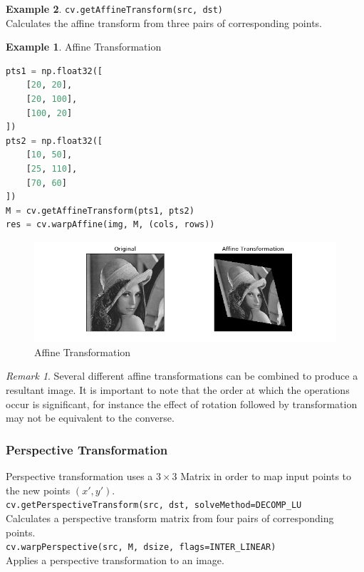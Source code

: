 \documentclass{article}
\theoremstyle{definition}
\newtheorem{ex}{Example}[subsection]
\theoremstyle{remark}
\newtheorem*{rem}{Remark}
\newcommand{\func}[2]{\noindent\lstinline{#1}\\#2}
\begin{document}
\begin{ex}
\func{cv.getAffineTransform(src, dst)}{Calculates the affine transform from three pairs of corresponding points.}

\begin{ex} Affine Transformation
\begin{lstlisting}[language=Python]
pts1 = np.float32([ 
    [20, 20],
    [20, 100],
    [100, 20]
])
pts2 = np.float32([ 
    [10, 50],
    [25, 110],
    [70, 60]
])
M = cv.getAffineTransform(pts1, pts2)
res = cv.warpAffine(img, M, (cols, rows))
\end{lstlisting}
\end{ex}
\begin{figure}[h!]
    \centering
    \includegraphics[width=\textwidth]{ocv_gt_afftran}
    \caption{Affine Transformation}
    \label{fig:ocv_gt_afftran}
\end{figure}
\end{ex}

\begin{rem}
Several different affine transformations can be combined to produce a resultant image. It is important to note that the order at which the operations occur is significant, for instance the effect of rotation followed by transformation may not be equivalent to the converse.
\end{rem}


\subsubsection{Perspective Transformation}

Perspective transformation uses a $ 3 \times 3 $ Matrix in order to map input points to the new points $ (x', y') $.\\

\func{cv.getPerspectiveTransform(src, dst, solveMethod=DECOMP_LU}{Calculates a perspective transform matrix from four pairs of corresponding points.}\\

\func{cv.warpPerspective(src, M, dsize, flags=INTER_LINEAR)}{Applies a perspective transformation to an image.}
\end{document}
